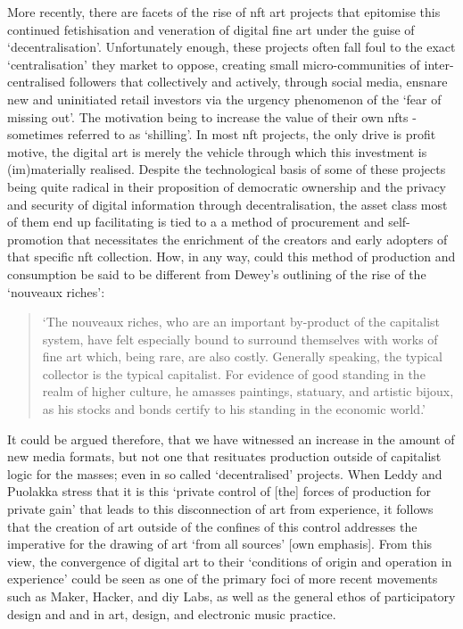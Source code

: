 More recently, there are facets of the rise of \gls{nft} art projects that epitomise this continued fetishisation and veneration of digital fine art under the guise of `decentralisation'. Unfortunately enough, these projects often fall foul to the exact `centralisation' they market to oppose, creating small micro-communities of inter-centralised followers that collectively and actively, through social media, ensnare new and uninitiated retail investors via the urgency phenomenon of the `fear of missing out'. The motivation being to increase the value of their own \glspl{nft} - sometimes referred to as `shilling'. In most \gls{nft} projects, the only drive is profit motive, the digital art is merely the vehicle through which this investment is (im)materially realised. Despite the technological basis of some of these projects being quite radical in their proposition of democratic ownership and the privacy and security of digital information through decentralisation, the asset class most of them end up facilitating is tied to a a method of procurement and self-promotion that necessitates the enrichment of the creators and early adopters of that specific \gls{nft} collection. How, in any way, could this method of production and consumption be said to be different from Dewey's outlining of the rise of the `nouveaux riches':
\begin{quote}
    `The nouveaux riches, who are an important by-product of the capitalist system, have felt especially bound to surround themselves with works of fine art which, being rare, are also costly. Generally speaking, the typical collector is the typical capitalist. For evidence of good standing in the realm of higher culture, he amasses paintings, statuary, and artistic bijoux, as his stocks and bonds certify to his standing in the economic world.' \citeyearpar[p. 7]{dewey1934}
\end{quote}
It could be argued therefore, that we have witnessed an increase in the amount of new media formats, but not one that resituates production outside of capitalist logic for the masses; even in so called `decentralised' projects. When Leddy and Puolakka stress that it is this `private control of [the] forces of production for private gain' that leads to this disconnection of art from experience, it follows that the creation of art outside of the confines of this control addresses the imperative for the drawing of art `from all sources' [own emphasis]. From this view, the convergence of digital art to their `conditions of origin and operation in experience' could be seen as one of the primary foci of more recent movements such as Maker, Hacker, and \gls{diy} Labs, as well as the general ethos of participatory design and   and  in art, design, and electronic music practice.

